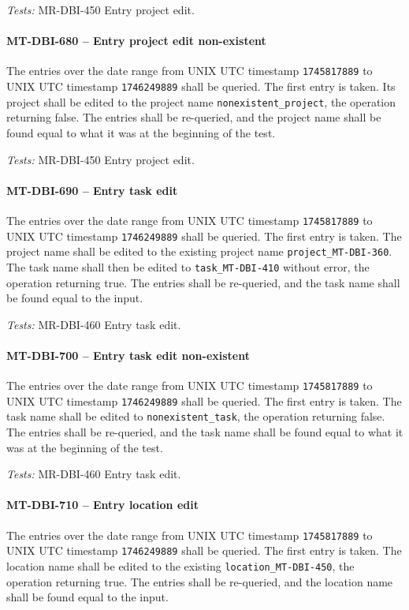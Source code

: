 \textit{Tests: } MR-DBI-450 Entry project edit.

\paragraph{MT-DBI-680 -- Entry project edit non-existent}
The entries over the date range from UNIX UTC timestamp
\lstinline{1745817889} to UNIX UTC timestamp \lstinline{1746249889}
shall be queried. The first entry is taken.
Its project shall be edited to the project name \lstinline{nonexistent_project},
the operation returning false.
The entries shall be re-queried, and the project name shall be
found equal to what it was at the beginning of the test.

\textit{Tests: } MR-DBI-450 Entry project edit.

\paragraph{MT-DBI-690 -- Entry task edit}
The entries over the date range from UNIX UTC timestamp
\lstinline{1745817889} to UNIX UTC timestamp \lstinline{1746249889}
shall be queried. The first entry is taken.
The project name shall be edited to the existing project name
\lstinline{project_MT-DBI-360}.
The task name shall then be edited to \lstinline{task_MT-DBI-410}
without error, the operation returning true.
The entries shall be re-queried, and the task name shall be found
equal to the input.

\textit{Tests: } MR-DBI-460 Entry task edit.

\paragraph{MT-DBI-700 -- Entry task edit non-existent}
The entries over the date range from UNIX UTC timestamp
\lstinline{1745817889} to UNIX UTC timestamp \lstinline{1746249889}
shall be queried. The first entry is taken.
The task name shall be edited to \lstinline{nonexistent_task},
the operation returning false.
The entries shall be re-queried, and the task name shall be
found equal to what it was at the beginning of the test.

\textit{Tests: } MR-DBI-460 Entry task edit.

\paragraph{MT-DBI-710 -- Entry location edit}
The entries over the date range from UNIX UTC timestamp
\lstinline{1745817889} to UNIX UTC timestamp \lstinline{1746249889}
shall be queried. The first entry is taken.
The location name shall be edited to the existing
\lstinline{location_MT-DBI-450}, the operation returning true.
The entries shall be re-queried, and the location name shall be
found equal to the input.

